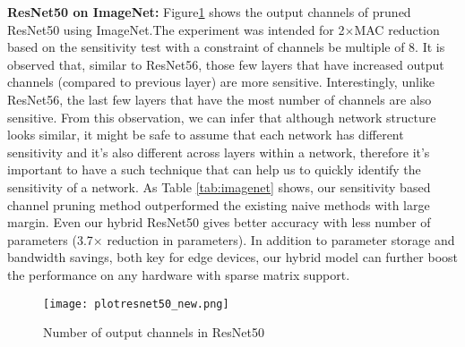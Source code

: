 \documentclass{article}
\begin{document}
 













\textbf{ResNet50 on ImageNet:}
Figure\ref{fig:channelprune50} shows the output channels of pruned ResNet50 using ImageNet.The experiment was intended for 2$\times$MAC reduction based on the sensitivity test with a constraint of channels be multiple of 8. %
It is observed that, similar to ResNet56, those few layers that have increased output channels (compared to previous layer) are more sensitive. Interestingly, unlike ResNet56, the last few layers that have the most number of channels are also sensitive. From this observation, we can infer that although network structure looks similar, it might be safe to assume that each network has different sensitivity and it's also different across layers within a network, therefore it's important to have a such technique that can help us to quickly identify the sensitivity of a network. As Table \ref{tab:imagenet} shows, our sensitivity based channel pruning method outperformed the existing naive methods with large margin. Even our hybrid ResNet50 gives better accuracy with less number of parameters (3.7$\times$ reduction in parameters). In addition to parameter storage and bandwidth savings, both key for edge devices, our hybrid model can further boost the performance on any hardware with sparse matrix support.

\begin{figure}[!htbp]
\vspace{-6mm}
\begin{center}
\texttt{[image: plotresnet50\_new.png]}
\end{center}
\vspace{-3.5mm}
\caption{Number of output channels in ResNet50}
\vspace{-2mm}
\label{fig:channelprune50}
\end{figure}


 
\end{document}

